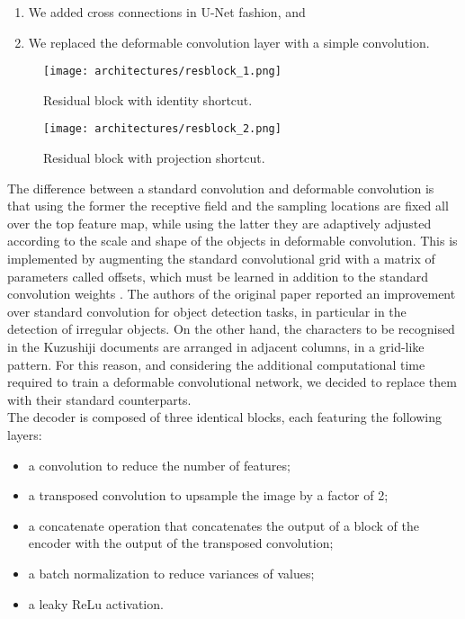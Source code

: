 \begin{enumerate}
	\item We added cross connections in U-Net fashion, and
	\item We replaced the deformable convolution layer with a simple convolution.
\end{enumerate}

\begin{figure}[h]
	\caption{Residual block with identity shortcut.}
	\centering
	\texttt{[image: architectures/resblock\_1.png]}
	\label{fig:resblock1}
\end{figure}

\begin{figure}[h]
	\caption{Residual block with projection shortcut.}
	\centering
	\texttt{[image: architectures/resblock\_2.png]}
	\label{fig:resblock2}
\end{figure}

The difference between a standard convolution and deformable convolution is that using the former the receptive field and the sampling locations are fixed all over the top feature map, while using the latter they are adaptively adjusted according to the scale and shape of the objects in deformable convolution. This is implemented by augmenting the standard convolutional grid with a matrix of parameters called offsets, which must be learned in addition to the standard convolution weights \cite{DeformableConv2017}. The authors of the original paper reported an improvement over standard convolution for object detection tasks, in particular in the detection of irregular objects. On the other hand, the characters to be recognised in the Kuzushiji documents are arranged in adjacent columns, in a grid-like pattern. For this reason, and considering the additional computational time required to train a deformable convolutional network, we decided to replace them with their standard counterparts. \\

The decoder is composed of three identical blocks, each featuring the following layers:

\begin{itemize}
	\item a convolution to reduce the number of features;
	\item a transposed convolution to upsample the image by a factor of 2;
	\item a concatenate operation that concatenates the output of a block of the encoder with the output of the transposed convolution;
	\item a batch normalization to reduce variances of values;
	\item a leaky ReLu activation.
\end{itemize}


